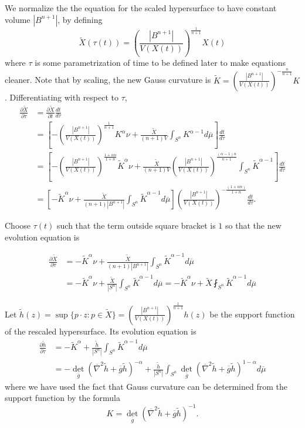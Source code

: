 \documentclass[12pt,a4paper]{article}
\begin{document}
We normalize the the equation for the scaled hypersurface to have constant volume $ |B^{n+1}| $, by defining 
\[ \tilde{X}(\tau(t)) = \left( \frac{|B^{n+1}|}{V(X(t))} \right)^{\frac{1}{n+1}}X(t) \]
where $ \tau $ is some parametrization of time to be defined later to make equations cleaner. Note that by scaling, the new Gauss curvature is $ \tilde{K} = \left(  \frac{|B^{n+1}|}{V(X(t))} \right)^{ -\frac{n}{n+1}}K $. Differentiating with respect to $ \tau $,
\begin{align*}
    \frac{\partial \tilde{X}}{\partial \tau} & = \frac{\partial \tilde{X}}{\partial t} \frac{d t}{d \tau} \\
    & = \left[-\left( \frac{|B^{n+1}|}{V(X(t))} \right)^{\frac{1}{n+1}}K^{\alpha}\nu+ \frac{\tilde{X}}{(n+1)V}\int_{S^{n}}K^{\alpha-1}d \overline{\mu}\right]\frac{d t}{d \tau} \\
    & = \left[-\left( \frac{|B^{n+1}|}{V(X(t))} \right)^{ \frac{1+\alpha n}{1+n}} \tilde{K}^{\alpha}\nu+ \frac{\tilde{X}}{(n+1)V}\left(  \frac{|B^{n+1}|}{V(X(t))} \right)^{ \frac{(\alpha-1)n}{n+1}}\int_{S^{n}}\tilde{K}^{\alpha -1}\right]\frac{d t}{d \tau}\\
    & = \left[-\tilde{K}^{\alpha}\nu + \frac{\tilde{X}}{(n+1)|B^{n+1}|}\int_{S^{n}}\tilde{K}^{\alpha-1} d \overline{\mu}\right]\left( \frac{|B^{n+1}|}{V(X(t))} \right)^{ -\frac{(1+\alpha n)}{1+n}} \frac{dt}{d \tau}. 
\end{align*}

Choose $ \tau(t) $ such that the term outside square bracket is $ 1 $ so that the new evolution equation is 

\begin{align*}
    \frac{\partial \tilde{X}}{\partial \tau} & = -\tilde{K}^{\alpha}\nu + \frac{\tilde{X}}{(n+1)|B^{n+1}|}\int_{S^{n}}\tilde{K}^{\alpha-1} d \overline{\mu} \\ 
    & =-\tilde{K}^{\alpha}\nu + \frac{\tilde{X}}{|S^{n}|}\int_{S^{n}}\tilde{K}^{\alpha-1} d \overline{\mu} =-\tilde{K}^{\alpha}\nu + \tilde{X}\fint_{S^{n}}\tilde{K}^{\alpha-1} d \overline{\mu}
\end{align*}

Let $ \tilde{h}(z) = \sup \{p \cdot z : p \in \tilde{X} \} = \left( \frac{|B^{n+1}|}{V(X(t))} \right)^{\frac{1}{n+1}} h(z) $ be the support function of the rescaled hypersurface. Its evolution equation is
\begin{align*}
    \frac{\partial \tilde{h}}{\partial \tau} &= - \tilde{K}^{\alpha} + \frac{\tilde{h}}{|S^{n}|}\int_{S^{n}}\tilde{K}^{\alpha-1} d \overline{\mu} \\
    & = - \det_{\overline{g}}(\overline{\nabla}^{2}\tilde{h}+\overline{g}\tilde{h})^{-\alpha} + \frac{\tilde{h}}{|S^{n}|}\int_{S^{n}}\det_{\overline{g}}(\overline{\nabla}^{2}\tilde{h}+\overline{g}\tilde{h})^{1-\alpha} d \overline{\mu}
\end{align*}
where we have used the fact that Gauss curvature can be determined from the support function by the formula 
\[ K = \det_{\overline{g}}(\overline{\nabla}^{2}\tilde{h}+\overline{g}\tilde{h})^{-1} .\]
\end{document}
